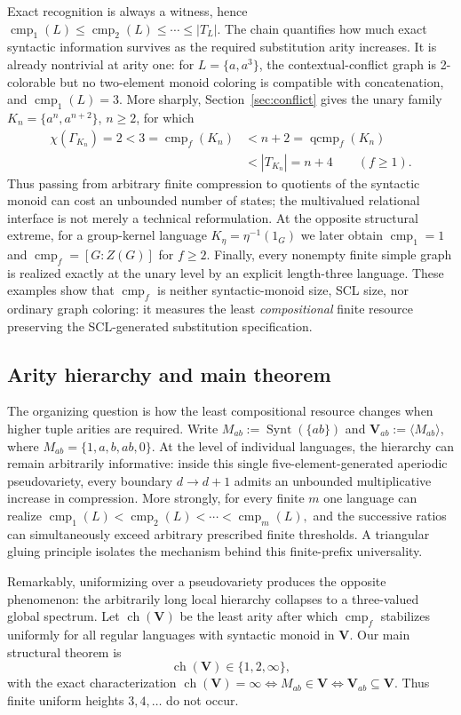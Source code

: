 \documentclass[10pt,a4paper]{article}
\theoremstyle{definition}
\theoremstyle{remark}
\newcommand{\cmp}{\operatorname{cmp}}
\newcommand{\qcmp}{\operatorname{qcmp}}
\begin{document}
Exact recognition is always a witness, hence
\(\cmp_1(L)\le \cmp_2(L)\le\cdots\le |T_L|.\)
The chain quantifies how much exact syntactic information survives as the
required substitution arity increases.  It is already nontrivial at arity one:
for $L=\{a,a^3\}$, the contextual-conflict graph is 2-colorable but no
two-element monoid coloring is compatible with concatenation, and
$\cmp_1(L)=3$.  More sharply, Section~\ref{sec:conflict} gives the unary
family $K_n=\{a^n,a^{n+2}\}$, $n\ge2$, for which
\[
\begin{aligned}
 \chi(\Gamma_{K_n})=2<3=\cmp_f(K_n)&<n+2=\qcmp_f(K_n)\\
 &<|T_{K_n}|=n+4 \qquad(f\ge1).
\end{aligned}
\]
Thus passing from arbitrary finite compression to quotients of the syntactic
monoid can cost an unbounded number of states; the multivalued relational
interface is not merely a technical reformulation.  At the opposite structural
extreme, for a group-kernel language $K_\eta=\eta^{-1}(1_G)$ we later obtain
$\cmp_1=1$ and $\cmp_f=[G:Z(G)]$ for $f\ge2$.  Finally, every nonempty finite simple graph is
realized exactly at the unary level by an explicit length-three language.  These
examples show that $\cmp_f$ is neither syntactic-monoid size, SCL size, nor
ordinary graph coloring: it measures the least \emph{compositional} finite
resource preserving the SCL-generated substitution specification.

\subsection{Arity hierarchy and main theorem}

The organizing question is how the least compositional resource changes when
higher tuple arities are required.  Write
\(M_{ab}:=\operatorname{Synt}(\{ab\})\) and
\(\mathbf V_{ab}:=\langle M_{ab}\rangle\), where
\(M_{ab}=\{1,a,b,ab,0\}\).
At the level of individual languages, the hierarchy can remain arbitrarily
informative: inside this single five-element-generated aperiodic
pseudovariety, every boundary \(d\to d+1\) admits an unbounded multiplicative
increase in compression.  More strongly, for every finite \(m\) one language
can realize
\(\cmp_1(L)<\cmp_2(L)<\cdots<\cmp_m(L),\)
and the successive ratios can simultaneously exceed arbitrary prescribed
finite thresholds.  A triangular gluing principle isolates the mechanism
behind this finite-prefix universality.

Remarkably, uniformizing over a pseudovariety produces the opposite
phenomenon: the arbitrarily long local hierarchy collapses to a
three-valued global spectrum.  Let
\(\operatorname{ch}(\mathbf V)\) be the least arity after which \(\cmp_f\)
stabilizes uniformly for all regular languages with syntactic monoid in
\(\mathbf V\).  Our main structural theorem is
\[
 \boxed{\operatorname{ch}(\mathbf V)\in\{1,2,\infty\}},
\]
with the exact characterization
\(\operatorname{ch}(\mathbf V)=\infty \Longleftrightarrow M_{ab}\in\mathbf V \Longleftrightarrow \mathbf V_{ab}\subseteq\mathbf V.\)
Thus finite uniform heights \(3,4,\ldots\) do not occur.
\end{document}
